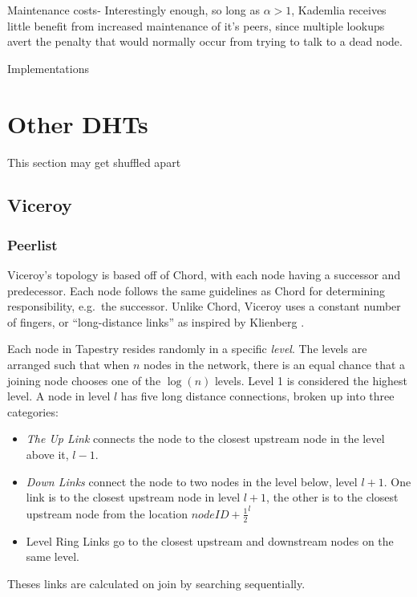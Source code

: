 \documentclass[10pt,letterpaper]{report}
\begin{document}
Maintenance costs-  Interestingly enough, so long as $\alpha >1$, Kademlia receives little benefit from increased maintenance of it's peers, since multiple lookups avert the penalty that would normally occur from trying to talk to a dead node.


Implementations




\chapter{Other DHTs}
This section may get shuffled apart

\section{Viceroy}
\cite{malkhi2001viceroy}


\subsection*{Peerlist}



Viceroy's topology is based off of Chord, with each node having a successor and predecessor.  
Each node follows the same guidelines as Chord for determining responsibility, e.g.\ the successor.
Unlike Chord, Viceroy uses a constant number of fingers, or ``long-distance links'' as inspired by Klienberg \cite{kleinberg2000small}.


Each node in Tapestry resides randomly in a specific \textit{level}. 
The levels are arranged such that when $n$ nodes in the network, there is an equal chance that a joining node chooses one of the $\log(n)$ levels.
Level 1 is considered the highest level.
A node in level $l$ has five long distance connections, broken up into three categories:
\begin{itemize}
	\item \textit{The Up Link} connects the node to the closest upstream node in the level above it, $ l - 1$.
	\item \textit{Down Links} connect the node to two nodes in the level below, level  $l + 1$.  One link is to the closest upstream node in  level $l + 1$, the other is to the closest upstream node from the location $nodeID + \frac{1}{2}^{l}$
	\item Level Ring Links go to the closest upstream and downstream nodes on the same level.
\end{itemize}
Theses links are calculated on join by searching sequentially.
\end{document}
